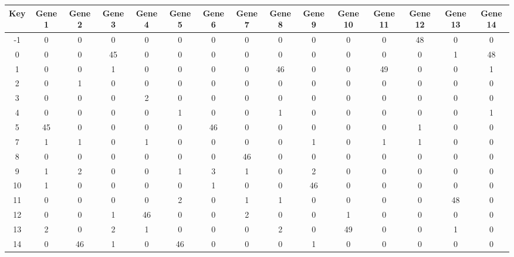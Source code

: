 \begin{tabular}{|c|c|c|c|c|c|c|c|c|c|c|c|c|c|c|}
\hline
Key & Gene 1 & Gene 2 & Gene 3 & Gene 4 & Gene 5 & Gene 6 & Gene 7 & Gene 8 & Gene 9 & Gene 10 & Gene 11 & Gene 12 & Gene 13 & Gene 14 \\
\hline
-1 & 0 & 0 & 0 & 0 & 0 & 0 & 0 & 0 & 0 & 0 & 0 & 48 & 0 & 0 \\
0 & 0 & 0 & 45 & 0 & 0 & 0 & 0 & 0 & 0 & 0 & 0 & 0 & 1 & 48 \\
1 & 0 & 0 & 1 & 0 & 0 & 0 & 0 & 46 & 0 & 0 & 49 & 0 & 0 & 1 \\
2 & 0 & 1 & 0 & 0 & 0 & 0 & 0 & 0 & 0 & 0 & 0 & 0 & 0 & 0 \\
3 & 0 & 0 & 0 & 2 & 0 & 0 & 0 & 0 & 0 & 0 & 0 & 0 & 0 & 0 \\
4 & 0 & 0 & 0 & 0 & 1 & 0 & 0 & 1 & 0 & 0 & 0 & 0 & 0 & 1 \\
5 & 45 & 0 & 0 & 0 & 0 & 46 & 0 & 0 & 0 & 0 & 0 & 1 & 0 & 0 \\
7 & 1 & 1 & 0 & 1 & 0 & 0 & 0 & 0 & 1 & 0 & 1 & 1 & 0 & 0 \\
8 & 0 & 0 & 0 & 0 & 0 & 0 & 46 & 0 & 0 & 0 & 0 & 0 & 0 & 0 \\
9 & 1 & 2 & 0 & 0 & 1 & 3 & 1 & 0 & 2 & 0 & 0 & 0 & 0 & 0 \\
10 & 1 & 0 & 0 & 0 & 0 & 1 & 0 & 0 & 46 & 0 & 0 & 0 & 0 & 0 \\
11 & 0 & 0 & 0 & 0 & 2 & 0 & 1 & 1 & 0 & 0 & 0 & 0 & 48 & 0 \\
12 & 0 & 0 & 1 & 46 & 0 & 0 & 2 & 0 & 0 & 1 & 0 & 0 & 0 & 0 \\
13 & 2 & 0 & 2 & 1 & 0 & 0 & 0 & 2 & 0 & 49 & 0 & 0 & 1 & 0 \\
14 & 0 & 46 & 1 & 0 & 46 & 0 & 0 & 0 & 1 & 0 & 0 & 0 & 0 & 0 \\
\hline
\end{tabular}